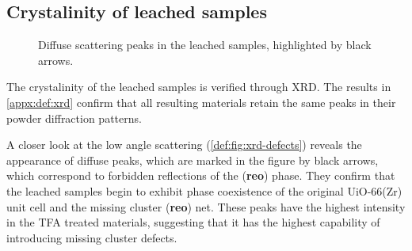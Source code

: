 
\subsection{Crystalinity of leached samples}\label{def:xrd}

\begin{wrapfigure}[13]{r}{0.3\textwidth}
    \centering
    \captionsetup{format=plain}
    \caption{Diffuse scattering peaks in the  leached 
    samples, highlighted by black arrows.}%
    \label{def:fig:xrd-defects}
\end{wrapfigure}

The crystalinity of the leached samples is verified through 
\gls{XRD}. The results in \autoref{appx:def:xrd} confirm that all 
resulting materials retain the same peaks in their powder
diffraction patterns.

A closer look at the low angle scattering (\autoref{def:fig:xrd-defects})
reveals the appearance of diffuse peaks, which are marked in the 
figure by black arrows, which correspond to forbidden
reflections of the (\textbf{reo}) phase. They confirm that the 
leached samples begin to exhibit phase coexistence of 
the original UiO-66(Zr) unit cell and the missing cluster
(\textbf{reo}) net. These peaks have the highest intensity in 
the \gls{TFA} treated materials, suggesting that it has the highest 
capability of introducing missing cluster defects.